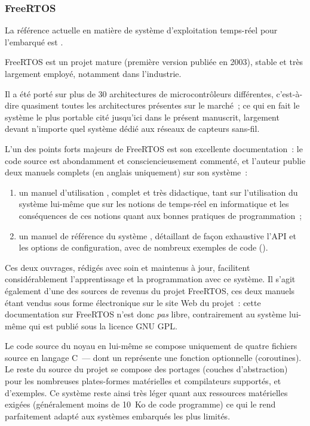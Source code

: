 \subsubsection{FreeRTOS}
\label{SubsecFreeRTOS}


La référence actuelle en matière de système d'exploitation temps-réel
 pour l'embarqué est  \cite{FreeRTOS}.

FreeRTOS est un projet mature (première version publiée en 2003),
stable et très largement employé, notamment dans l'industrie.

Il a été porté sur plus de 30 architectures de microcontrôleurs différentes,
c'est-à-dire quasiment toutes les architectures présentes sur le marché~;
ce qui en fait le système le plus portable cité jusqu'ici dans le présent
manuscrit, largement devant n'importe quel système dédié aux réseaux de
capteurs sans-fil.

L'un des points forts majeurs de FreeRTOS est son excellente documentation~:
le code source est abondamment et consciencieusement commenté, et l'auteur
publie deux manuels complets (en anglais uniquement) sur son système~:
\begin{enumerate}
\item un manuel d'utilisation \cite{FreeRTOSTuto}, complet et très
didactique, tant sur l'utilisation du système lui-même que sur les notions
de temps-réel en informatique et les conséquences de ces notions quant aux
bonnes pratiques de programmation~;
\item un manuel de référence du système \cite{FreeRTOSRef}, détaillant
de façon exhaustive l'API et les options de configuration, avec de
nombreux exemples de code ().
\end{enumerate}
Ces deux ouvrages, rédigés avec soin et maintenus à jour, facilitent
considérablement l'apprentissage et la programmation avec ce système.
Il s'agit également d'une des sources de revenus du projet FreeRTOS,
ces deux manuels étant vendus sous forme électronique sur le site
Web du projet~: cette documentation sur FreeRTOS n'est donc
\emph{pas} libre, contrairement au système lui-même qui est publié
sous la licence GNU GPL.

Le code source du noyau en lui-même se compose uniquement de quatre fichiers
source en langage C~--- dont un représente une fonction optionnelle
(coroutines). Le reste du source du projet se compose des portages (couches
d'abstraction) pour les nombreuses plates-formes matérielles et compilateurs
supportés, et d'exemples. Ce système reste ainsi très léger quant aux
ressources matérielles exigées (généralement moins de 10~Ko de code
programme) ce qui le rend parfaitement adapté aux systèmes embarqués
les plus limités.

